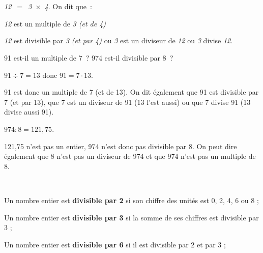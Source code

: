 \section{} %


\begin{methode*1}

\begin{aconnaitre}
\emph{12 $=$ 3 $\times$ 4}. On dit que :

\textcolor{C2}{\emph{12} est un multiple de \emph{3 (et de 4)}}

\textcolor{A1}{\emph{12} est divisible par \emph{3 (et par 4)}} ou \textcolor{J1}{\emph{3} est un diviseur de \emph{12}} ou \textcolor{H1}{\emph{3} divise \emph{12}}.
\end{aconnaitre}

\begin{exemple*1}
91 est-il un multiple de 7 ? 974 est-il divisible par 8 ? \\[1em]
\begin{minipage}[t]{0.46\linewidth}
$91 \div 7 = 13$ donc $91 = 7 \cdot 13$.

91 est donc un multiple de 7 (et de 13). On dit également que 91 est divisible par 7 (et par 13), que 7 est un diviseur de 91 (13 l'est aussi) ou que 7 divise 91 (13 divise aussi 91).
 \end{minipage} \hfill%
 \begin{minipage}[t]{0.46\linewidth}
 $974 : 8 = 121,75$.
 
121,75 n'est pas un entier, 974 n'est donc pas divisible par 8. On peut dire également que 8 n'est pas un diviseur de 974 et que 974 n'est pas un multiple de 8.
 \end{minipage} \\
  \end{exemple*1}
  
\begin{aconnaitre}
Un nombre entier est \textbf{\textcolor{A1}{divisible par 2}} si son chiffre des unités est 0, 2, 4, 6 ou 8 ;

Un nombre entier est \textbf{\textcolor{A1}{divisible par 3}} si la somme de ses chiffres est divisible par 3 ;

Un nombre entier est \textbf{\textcolor{A1}{divisible par 6}} si il est divisible par 2 et par 3 ;


\end{aconnaitre}
\end{methode*1}
